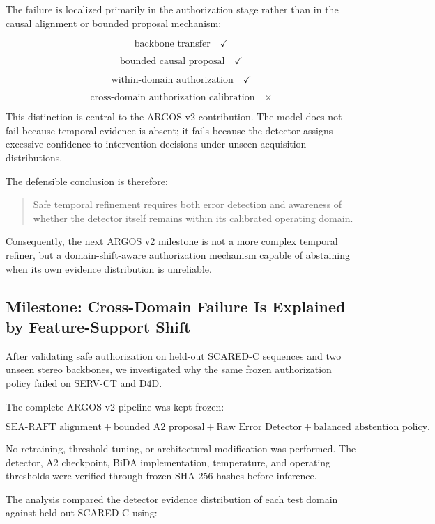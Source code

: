\documentclass[11pt,a4paper]{article}
\begin{document}
The failure is localized primarily in the authorization stage rather than in the causal alignment or bounded proposal mechanism:

\[
\text{backbone transfer} \quad \checkmark
\]

\[
\text{bounded causal proposal} \quad \checkmark
\]

\[
\text{within-domain authorization} \quad \checkmark
\]

\[
\text{cross-domain authorization calibration} \quad \times
\]

This distinction is central to the ARGOS v2 contribution. The model does not fail because temporal evidence is absent; it fails because the detector assigns excessive confidence to intervention decisions under unseen acquisition distributions.

The defensible conclusion is therefore:

\begin{quote}
Safe temporal refinement requires both error detection and awareness of whether the detector itself remains within its calibrated operating domain.
\end{quote}

Consequently, the next ARGOS v2 milestone is not a more complex temporal refiner, but a domain-shift-aware authorization mechanism capable of abstaining when its own evidence distribution is unreliable.

\subsection{Milestone: Cross-Domain Failure Is Explained by Feature-Support Shift}

After validating safe authorization on held-out SCARED-C sequences and two unseen stereo backbones, we investigated why the same frozen authorization policy failed on SERV-CT and D4D.

The complete ARGOS v2 pipeline was kept frozen:

\[
\text{SEA-RAFT alignment}
+
\text{bounded A2 proposal}
+
\text{Raw Error Detector}
+
\text{balanced abstention policy}.
\]

No retraining, threshold tuning, or architectural modification was performed. The detector, A2 checkpoint, BiDA implementation, temperature, and operating thresholds were verified through frozen SHA-256 hashes before inference.

The analysis compared the detector evidence distribution of each test domain against held-out SCARED-C using:
\end{document}
